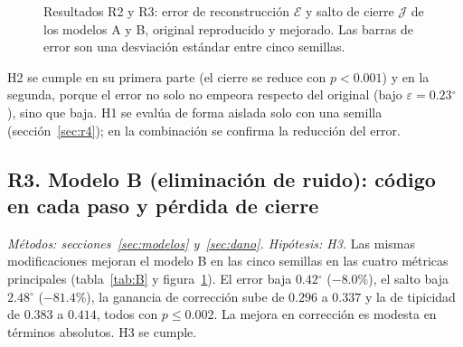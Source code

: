 \documentclass[11pt,a4paper]{article}
\newcommand{\gr}{$^{\circ}$}
\begin{document}
\begin{figure}[h]
\centering
{}
\caption{Resultados R2 y R3: error de reconstrucción $\mathcal E$ y salto de cierre $\mathcal J$ de los modelos A y B, original reproducido y mejorado. Las barras de error son una desviación estándar entre cinco semillas.}
\label{fig:barras}
\end{figure}

H2 se cumple en su primera parte (el cierre se reduce con $p<0.001$) y en la segunda, porque el error no solo no empeora respecto del original (bajo $\varepsilon=0.23$\gr), sino que baja. H1 se evalúa de forma aislada solo con una semilla (sección~\ref{sec:r4}); en la combinación se confirma la reducción del error.

\subsection{R3. Modelo B (eliminación de ruido): código en cada paso y pérdida de cierre}
\label{sec:r3}

\textit{Métodos: secciones~\ref{sec:modelos} y~\ref{sec:dano}. Hipótesis: H3.} Las mismas modificaciones mejoran el modelo B en las cinco semillas en las cuatro métricas principales (tabla~\ref{tab:B} y figura~\ref{fig:barras}). El error baja $0.42$\gr{} ($-8.0\%$), el salto baja $2.48$\gr{} ($-81.4\%$), la ganancia de corrección sube de $0.296$ a $0.337$ y la de tipicidad de $0.383$ a $0.414$, todos con $p\le0.002$. La mejora en corrección es modesta en términos absolutos. H3 se cumple.
\end{document}
